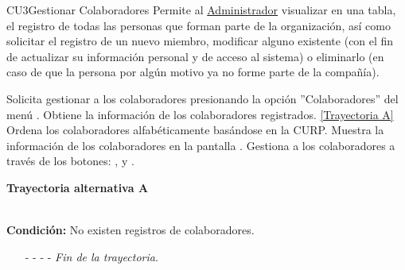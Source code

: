 	\begin{UseCase}{CU3}{Gestionar Colaboradores}{
		Permite al {\hyperlink{admin}{Administrador} visualizar en una tabla, el registro de todas las personas que forman parte de la organización, así como solicitar el registro de un nuevo miembro, modificar alguno existente (con el fin de actualizar su información personal y de acceso al sistema) o eliminarlo (en caso de que la persona por algún motivo ya no forme parte de la compañía).\\}
	}
\end{UseCase}
\begin{UCtrayectoria}
	\UCpaso[\UCactor] Solicita gestionar a los colaboradores presionando la opción ''Colaboradores'' del menú .
	\UCpaso[\UCsist] Obtiene la información de los colaboradores registrados. \hyperlink{CU3:TAA}{[Trayectoria A]}
	\UCpaso[\UCsist] Ordena los colaboradores alfabéticamente basándose en la CURP.
	\UCpaso[\UCsist] Muestra la información de los colaboradores en la pantalla . \label{CU3-P3}
	\UCpaso[\UCactor] Gestiona a los colaboradores a través de los botones: , \editar  y \eliminar.
\end{UCtrayectoria}		
\hypertarget{CU3:TAA}{\textbf{Trayectoria alternativa A}}\\
\noindent \textbf{Condición:} No existen registros de colaboradores.
\begin{enumerate}
	\UCpaso[\UCsist] Muestra el mensaje  en la pantalla  para indicar que no hay registros de colaboradores para mostrar. \label{CU3-A2}
	\UCpaso[\UCactor] Gestiona a los colaboradores a través del botón: . 
	\item[- -] - - {\em {Fin de la trayectoria}}.%
\end{enumerate}


